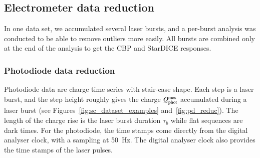 \subsection{Electrometer data reduction}

In one data set, we accumulated several laser bursts, and a per-burst analysis was conducted to be able to remove outliers more easily. All bursts are combined only at the end of the analysis to get the CBP and StarDICE responses.


\subsubsection{Photodiode data reduction}
\label{sec:pd_reduction}

Photodiode data are charge time series with stair-case shape. Each step is a laser burst, and the step height roughly gives the charge $Q_{\mathrm{phot}}^{\mathrm{mes}}$ accumulated during a laser burst (see Figures~\ref{fig:sc_dataset_examples} and~\ref{fig:pd_reduc}). The length of the charge rise is the laser burst duration $\tau_b$ while flat sequences are dark times. For the photodiode, the time stamps come directly from the digital analyser clock, with a sampling at \SI{50}{\hertz}. The digital analyser clock also provides the time stamps of the laser pulses. 

